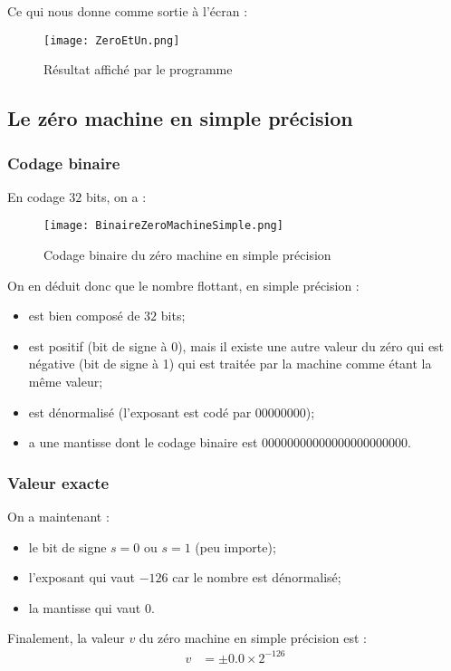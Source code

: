 \documentclass[a4paper, titlepage]{livret} %
\begin{document}
			Ce qui nous donne comme sortie à l'écran :
			\begin{figure}[!h]
				\centering
  					\texttt{[image: ZeroEtUn.png]}
  					\caption{Résultat affiché par le programme}
			\end{figure}
			\newpage

			\subsection{Le zéro machine en simple précision}
				\subsubsection{Codage binaire}
					En codage $32$ bits, on a :
					\begin{figure}[!h]
						\centering
  							\texttt{[image: BinaireZeroMachineSimple.png]}
  							\caption{Codage binaire du zéro machine en simple précision}
					\end{figure}

					On en déduit donc que le nombre flottant, en simple précision :
					\begin{itemize}
						\item est bien composé de $32$ bits;
						\item est positif (bit de signe à 0), mais il existe une autre valeur du zéro qui est négative (bit de signe à 1) qui est traitée par la machine comme étant la même valeur;
						\item est dénormalisé (l'exposant est codé par $00000000$);
						\item a une mantisse dont le codage binaire est $00000000 00000000 0000000$.
					\end{itemize}

				\subsubsection{Valeur exacte}
					On a maintenant : 
					\begin{itemize}
						\item le bit de signe $s = 0$ ou $s = 1$ (peu importe);
						\item l'exposant qui vaut $-126$ car le nombre est dénormalisé;
						\item la mantisse qui vaut $0$.
					\end{itemize}
					Finalement, la valeur $v$ du zéro machine en simple précision est :
					\[\begin{aligned}
						v & = \pm 0.0 \times 2^{-126}\\
					\end{aligned}\]
\end{document}
